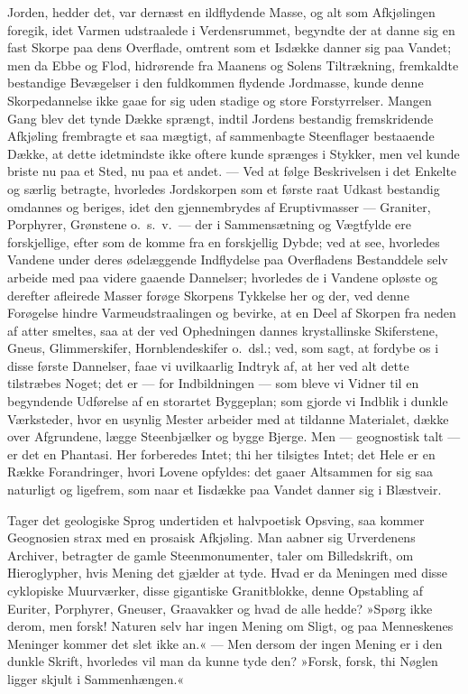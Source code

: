 \documentclass[12pt]{book}
\newcommand{\apage}[1]{\marginnote{\footnotesize\textit{[#1]}}}
\begin{document}
Jorden, hedder det, var dernæst en ildflydende Masse, og alt som
Afkjølingen foregik, idet Varmen udstraalede i Verdensrummet, begyndte der
at danne sig en fast Skorpe paa dens Overflade, omtrent som et Isdække
danner sig paa Vandet; men da Ebbe og Flod, hidrørende fra Maanens og
Solens Tiltrækning, fremkaldte bestandige Bevægelser i den fuldkommen
flydende Jordmasse, kunde denne Skorpedannelse ikke gaae for sig uden
stadige og store Forstyrrelser. Mangen Gang blev det tynde Dække sprængt,
indtil Jordens bestandig fremskridende Afkjøling frembragte et saa mægtigt,
af sammenbagte Steenflager bestaaende Dække, at dette idetmindste ikke
oftere kunde sprænges i Stykker, men vel kunde briste nu paa et Sted, nu
paa et andet. --- Ved at følge Beskrivelsen i det Enkelte og særlig betragte,
hvorledes Jordskorpen som et første raat Udkast bestandig omdannes og
beriges, idet den \apage{164} gjennembrydes af Eruptivmasser --- Graniter, Porphyrer,
Grønstene o.\ s.\ v.\ --- der i Sammensætning og Vægtfylde ere forskjellige,
efter som de komme fra en forskjellig Dybde; ved at see, hvorledes Vandene
under deres ødelæggende Indflydelse paa Overfladens Bestanddele selv
arbeide med paa videre gaaende Dannelser; hvorledes de i Vandene opløste og
derefter afleirede Masser forøge Skorpens Tykkelse her og der, ved denne
Forøgelse hindre Varmeudstraalingen og bevirke, at en Deel af Skorpen fra
neden af atter smeltes, saa at der ved Ophedningen dannes krystallinske
Skiferstene, Gneus, Glimmerskifer, Hornblendeskifer o.\ dsl.; ved, som
sagt, at fordybe os i disse første Dannelser, faae vi uvilkaarlig Indtryk
af, at her ved alt dette tilstræbes Noget; det er --- for Indbildningen --- som
bleve vi Vidner til en begyndende Udførelse af en storartet Byggeplan; som
gjorde vi Indblik i dunkle Værksteder, hvor en usynlig Mester arbeider med
at tildanne Materialet, dække over Afgrundene, lægge Steenbjælker og bygge
Bjerge. Men --- geognostisk talt --- er det en Phantasi. Her forberedes Intet;
thi her tilsigtes Intet; det Hele er en Række Forandringer, hvori Lovene
opfyldes: det gaaer Altsammen for sig saa naturligt og ligefrem, som naar
et Iisdække paa Vandet danner sig i Blæstveir.

Tager det geologiske Sprog undertiden et halvpoetisk Opsving, saa kommer
Geognosien strax med en prosaisk Afkjøling. Man aabner sig Urverdenens
Archiver, betragter de gamle Steenmonumenter, taler om Billedskrift, om
Hieroglypher, hvis Mening det \apage{165} gjælder at tyde. Hvad er da Meningen med disse
cyklopiske Muurværker, disse gigantiske Granitblokke, denne Opstabling af
Euriter, Porphyrer, Gneuser, Graavakker og hvad de alle hedde? »Spørg ikke
derom, men forsk! Naturen selv har ingen Mening om Sligt, og paa
Menneskenes Meninger kommer det slet ikke an.« --- Men dersom der ingen
Mening er i den dunkle Skrift, hvorledes vil man da kunne tyde den? »Forsk,
forsk, thi Nøglen ligger skjult i Sammenhængen.«
\end{document}
